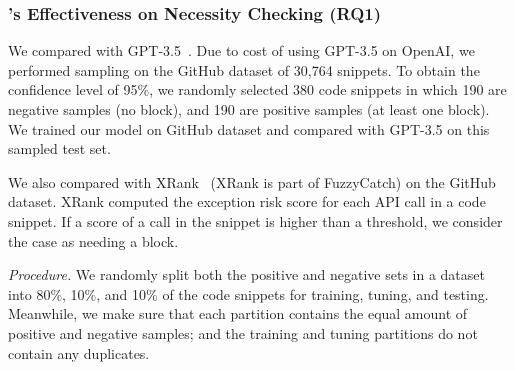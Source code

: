 \subsubsection{{\xblock}'s Effectiveness on  Necessity Checking (RQ1)}
 We compared {\xblock} with
GPT-3.5~\cite{ChatGPT}. Due to cost of using GPT-3.5 on OpenAI, we
performed sampling on the GitHub dataset of 30,764 snippets. To obtain
the confidence level of 95\%, we randomly selected 380 code snippets
in which 190 are negative samples (no  block), and 190
are positive samples (at least one  block). We trained
our model on GitHub dataset and compared with GPT-3.5 on this sampled
test set.

We also compared {\xblock} with XRank~\cite{xrank-fse20} (XRank is
part of FuzzyCatch) on the GitHub dataset. XRank computed the
exception risk score for each API call in a code snippet. If a score
of a call in the snippet is higher than a threshold, we consider the case as
needing a  block.

{\em Procedure.} We randomly split both the positive and negative sets
in a dataset into 80\%, 10\%, and 10\% of the code
snippets for training, tuning, and testing. Meanwhile, we make sure
that each partition contains the equal amount of positive and
negative samples; and the training and tuning partitions do not
contain any duplicates.

